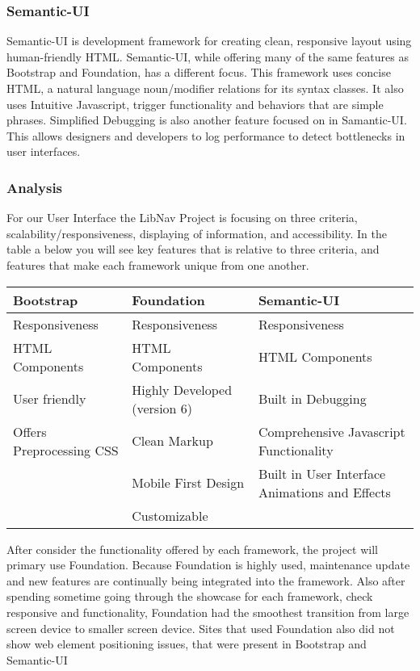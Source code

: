 \documentclass[letterpaper,10pt,titlepage, onecolumn, compsoc]{IEEEtran}
\begin{document}
\subsubsection{Semantic-UI}
Semantic-UI is development framework for creating clean, responsive layout using human-friendly HTML. Semantic-UI, while offering many of the same features as Bootstrap and Foundation, has a different focus. This framework uses concise HTML, a natural language noun/modifier relations for its syntax classes. It also uses Intuitive Javascript, trigger functionality and behaviors that are simple phrases. Simplified Debugging is also another feature focused on in Samantic-UI. This allows designers and developers to log performance to detect bottlenecks in user interfaces. \cite{semanticui2016}

\subsubsection{Analysis}
For our User Interface the LibNav Project is focusing on three criteria, scalability/responsiveness, displaying of information, and accessibility. In the table a below you will see key features that is relative to  three criteria, and features that make each framework unique from one another. 
\begin{center}
\begin{tabular}{|p{4.25cm}|p{4.25cm}|p{4.25cm}|}
\hline
\textbf{Bootstrap}       & \textbf{Foundation}         & \textbf{Semantic-UI} 
\\[1ex] \hline
Responsiveness           & Responsiveness               & Responsiveness                                 \\[1ex] \hline
HTML Components          & HTML Components              & HTML Components                                \\[1ex] \hline
User friendly            & Highly Developed (version 6) & Built in Debugging                             \\[1ex] \hline
Offers Preprocessing CSS & Clean Markup                 & Comprehensive Javascript Functionality         
\\[1ex] \hline
                         & Mobile First Design          & Built in User Interface Animations and Effects 
\\[1ex] \hline
                         & Customizable                 &                                     \\[1ex] \hline
\end{tabular}
\end{center}
After consider the functionality offered by each framework, the project will primary use Foundation. Because Foundation is highly used, maintenance update and new features are continually being integrated into the framework. Also after spending sometime going through the showcase for each framework, check responsive  and functionality, Foundation had the smoothest transition from large screen device to smaller screen device. Sites that used Foundation also did not show web element positioning issues, that were present in Bootstrap and Semantic-UI
\end{document}
